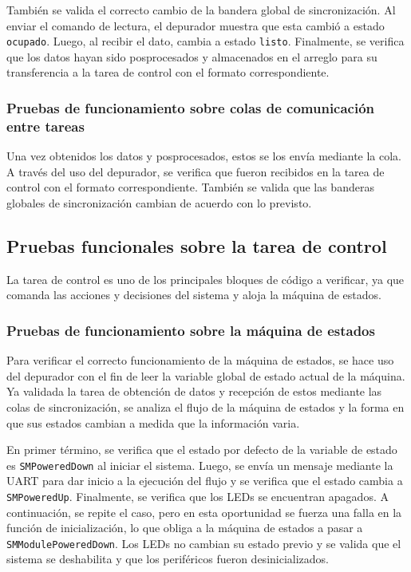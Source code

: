 También se valida el correcto cambio de la bandera global de sincronización. Al enviar el comando de lectura, el depurador muestra que esta cambió a estado \texttt{ocupado}. Luego, al recibir el dato, cambia a estado \texttt{listo}. Finalmente, se verifica que los datos hayan sido posprocesados y almacenados en el arreglo para su transferencia a la tarea de control con el formato correspondiente.

\subsubsection{Pruebas de funcionamiento sobre colas de comunicación entre tareas}
Una vez obtenidos los datos y posprocesados, estos se los envía mediante la cola. A través del uso del depurador, se verifica que fueron recibidos en la tarea de control con el formato correspondiente. También se valida que las banderas globales de sincronización cambian de acuerdo con lo previsto.

\subsection{Pruebas funcionales sobre la tarea de control}
La tarea de control es uno de los principales bloques de código a verificar, ya que comanda las acciones y decisiones del sistema y aloja la máquina de estados.

\subsubsection{Pruebas de funcionamiento sobre la máquina de estados}
Para verificar el correcto funcionamiento de la máquina de estados, se hace uso del depurador con el fin de leer la variable global de estado actual de la máquina. Ya validada la tarea de obtención de datos y recepción de estos mediante las colas de sincronización, se analiza el flujo de la máquina de estados y la forma en que sus estados cambian a medida que la información varia.

En primer término, se verifica que el estado por defecto de la variable de estado es \texttt{SMPoweredDown} al iniciar el sistema. Luego, se envía un mensaje mediante la UART para dar inicio a la ejecución del flujo y se verifica que el estado cambia a \texttt{SMPoweredUp}. Finalmente, se verifica que los LEDs se encuentran apagados. A continuación, se repite el caso, pero en esta oportunidad se fuerza una falla en la función de inicialización, lo que obliga a la máquina de estados a pasar a \texttt{SMModulePoweredDown}. Los LEDs no cambian su estado previo y se valida que el sistema se deshabilita y que los periféricos fueron desinicializados.

